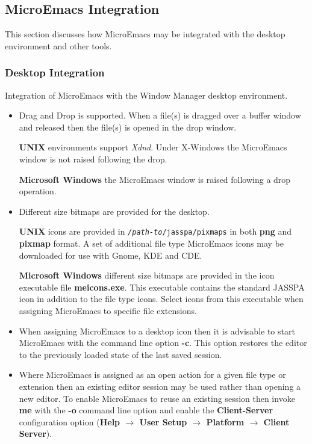 \documentclass[11pt,a4paper,pdftex]{article}
\begin{document}
\subsection{MicroEmacs Integration}

  This section discusses how MicroEmacs may be integrated with the desktop
  environment and other tools.

\subsubsection{Desktop Integration}

  Integration of MicroEmacs with the Window Manager desktop environment.

  \begin{itemize}

    \item Drag and Drop is supported. When a file(s) is dragged over a buffer
    window and released then the file(s) is opened in the drop window.

    \textbf{UNIX} environments support \textit{Xdnd}. Under X-Windows the
    MicroEmacs window is not raised following the drop.

    \textbf{Microsoft Windows} the MicroEmacs window is raised following
    a drop operation.

    \item Different size bitmaps are provided for the desktop.

    \textbf{UNIX} icons are provided in
    \texttt{\textit{/path-to}/jasspa/pixmaps} in both \textbf{png} and
    \textbf{pixmap} format. A set of additional file type MicroEmacs icons may
    be downloaded for use with Gnome, KDE and CDE.

    \textbf{Microsoft Windows} different size bitmaps are provided in the icon
    executable file \textbf{meicons.exe}. This executable contains the
    standard JASSPA icon in addition to the file type icons. Select icons from
    this executable when assigning MicroEmacs to specific file extensions.

    \item When assigning MicroEmacs to a desktop icon then it is advisable to
    start MicroEmacs with the command line option \textbf{-c}. This option
    restores the editor to the previously loaded state of the last saved
    session.

    \item Where MicroEmacs is assigned as an open action for a given file type
    or extension then an existing editor session may be used rather than
    opening a new editor. To enable MicroEmacs to reuse an existing session
    then invoke \textbf{me} with the \textbf{-o} command line option and
    enable the \textbf{Client-Server} configuration option (\textbf{Help
    $\rightarrow$ User Setup $\rightarrow$ Platform $\rightarrow$ Client
    Server}).


\end{itemize}
\end{document}
